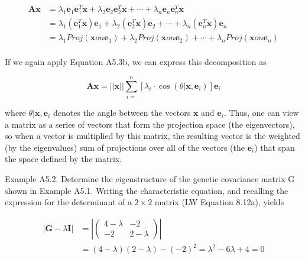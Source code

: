 \documentclass{article}
\begin{document}
\begin{equation}
\begin{aligned}\mathbf{A}\mathbf{x}&=\lambda_{1}\mathbf{e}_{1}\mathbf{e}_{1}^{T}\mathbf{x}+\lambda_{2}\mathbf{e}_{2}\mathbf{e}_{2}^{T}\mathbf{x}+\cdots+\lambda_{n}\mathbf{e}_{n}\mathbf{e}_{n}^{T}\mathbf{x}\\&=\lambda_{1}\left(\mathbf{e}_{1}^{T}\mathbf{x}\right)\mathbf{e}_{1}+\lambda_{2}\left(\mathbf{e}_{2}^{T}\mathbf{x}\right)\mathbf{e}_{2}+\cdots+\lambda_{n}\left(\mathbf{e}_{n}^{T}\mathbf{x}\right)\mathbf{e}_{n}\\&=\lambda_{1}Proj(\mathbf{x}on\mathbf{e}_{1})+\lambda_{2}Proj(\mathbf{x}on\mathbf{e}_{2})+\cdots+\lambda_{n}Proj(\mathbf{x}on\mathbf{e}_{n})\\ \end{aligned}
\end{equation}

If we again apply Equation A5.3b, we can express this decomposition as

\begin{equation}
\mathbf{A}\mathbf{x}=||\mathbf{x}||\sum_{i=}^{n}\left[\lambda_{i}\cdot\cos(\theta|\mathbf{x},\mathbf{e}_{i})\right]\mathbf{e}_{i}
\end{equation}

where  $ \theta|\mathbf{x}, \mathbf{e}_i $ denotes the angle between the vectors  $ \mathbf{x} $ and  $ \mathbf{e}_i $. Thus, one can view a matrix as a series of vectors that form the projection space (the eigenvectors), so when a vector is multiplied by this matrix, the resulting vector is the weighted (by the eigenvalues) sum of projections over all of the vectors (the  $ \mathbf{e}_i $) that span the space defined by the matrix.

Example A5.2. Determine the eigenstructure of the genetic covariance matrix G shown in Example A5.1. Writing the characteristic equation, and recalling the expression for the determinant of a  $ 2 \times 2 $ matrix (LW Equation 8.12a), yields

\begin{equation}
\begin{aligned}\left|\mathbf{G}-\lambda\mathbf{I}\right|&=\left|\begin{pmatrix}4-\lambda&-2\\ -2&2-\lambda\end{pmatrix}\right|\\&=(4-\lambda)(2-\lambda)-(-2)^{2}=\lambda^{2}-6\lambda+4=0\end{aligned}
\end{equation}
\end{document}
